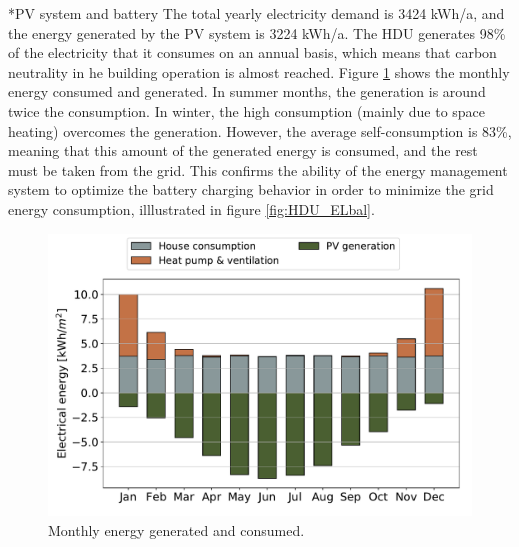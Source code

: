 \documentclass[twocolumn, a4paper,10pt]{article}
\makeatletter
\renewcommand\subsection{\@startsection{subsection}{1}{\z@}{\z@}{\z@}{\normalfont\normalsize\bfseries}}
\renewcommand\subsection{\@startsection{subsection}{1}{\z@}{\z@}{0.1pt}{\normalfont\normalsize\bfseries}}
\makeatother
\begin{document}
\subsection*{PV system and battery}
The total yearly electricity demand is 3424 kWh/a, and the energy generated by the PV system is 3224 kWh/a. The HDU generates 98\% of the electricity that it consumes on an annual basis, which means that carbon neutrality in he building operation is almost reached. Figure \ref{fig:HDU_PVbal} shows the monthly energy consumed and generated. In summer months, the generation is around twice the consumption. In winter, the high consumption (mainly due to space heating) overcomes the generation. However, the average self-consumption is 83\%, meaning that this amount of the generated energy is consumed, and the rest must be taken from the grid. This confirms the ability of the energy management system to optimize the battery charging behavior in order to minimize the grid energy consumption, illlustrated in figure \ref{fig:HDU_ELbal}.\\ 

\begin{figure}[H]
\vspace{-2pt} 
\centering
\includegraphics[scale=0.34]{img/HDU_PVbal.pdf}
\caption{Monthly energy generated and consumed.}
\label{fig:HDU_PVbal}
\end{figure}
\end{document}
